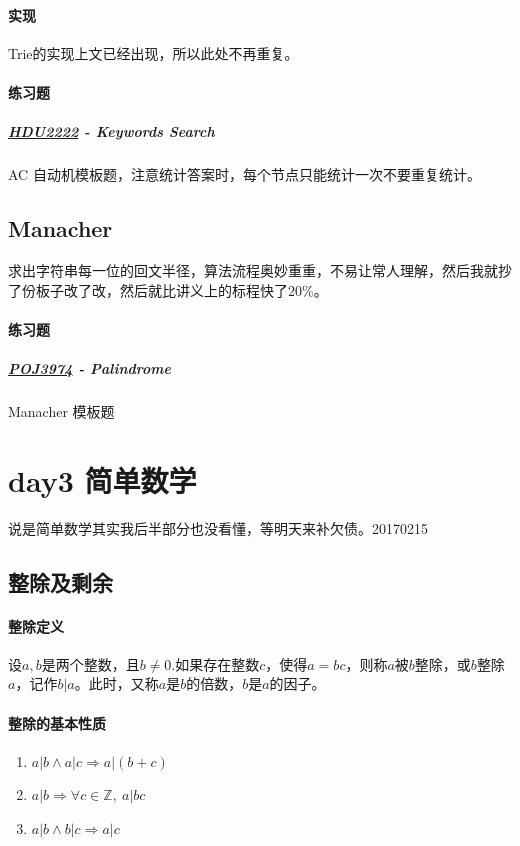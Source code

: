 \documentclass[]{cpp}
\begin{document}
\paragraph{实现}
	Trie的实现上文已经出现，所以此处不再重复。
\paragraph{练习题}
\subparagraph{\href{http://acm.hdu.edu.cn/showproblem.php?pid=2222}{HDU2222} - Keywords Search}
AC 自动机模板题，注意统计答案时，每个节点只能统计一次不要重复统计。
\subsection{Manacher}
求出字符串每一位的回文半径，算法流程奥妙重重，不易让常人理解，然后我就抄了份板子改了改，然后就比讲义上的标程快了$20\%$。
\paragraph{练习题}
\subparagraph{\href{http://poj.org/problem?id=3974}{POJ3974} - Palindrome}
Manacher 模板题
\section{day3 简单数学}
说是简单数学其实我后半部分也没看懂，等明天来补欠债。20170215\\
\subsection{整除及剩余}
\paragraph{整除定义}
	设$a,b$是两个整数，且$b\neq0$.如果存在整数$c$，使得$a=bc$，则称$a$被$b$整除，或$b$整除$a$，记作$b|a$。此时，又称$a$是$b$的倍数，$b$是$a$的因子。
\paragraph{整除的基本性质}
	\begin{enumerate}
		\item $a|b \land a|c \Rightarrow a|(b+c)$
		\item $a|b \Rightarrow \forall c\in\mathbb{Z},\ a|bc$
		\item $a|b \land b|c \Rightarrow a|c$
	\end{enumerate}
\end{document}
